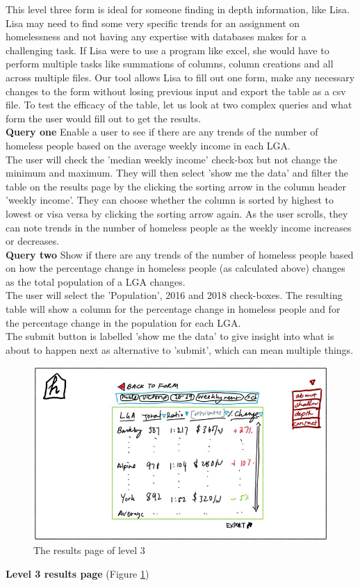 \documentclass[12pt, a4paper]{article}
\begin{document}
This level three form is ideal for someone finding in depth information, like Lisa. Lisa may need to find some very specific trends for an assignment on homelessness and not having any expertise with databases makes for a challenging task. If Lisa were to use a program like excel, she would have to perform multiple tasks like summations of columns, column creations and all across multiple files. Our tool allows Lisa to fill out one form, make any necessary changes to the form without losing previous input and export the table as a csv file.
To test the efficacy of the table, let us look at two complex queries and what form the user would fill out to get the results. \\
\textbf{Query one} Enable a user to see if there are any trends of the number of homeless people based on the average weekly income in each LGA. \\
The user will check the 'median weekly income' check-box but not change the minimum and maximum. They will then select 'show me the data' and filter the table on the results page by the clicking the sorting arrow in the column header 'weekly income'. They can choose whether the column is sorted by highest to lowest or visa versa by clicking the sorting arrow again. As the user scrolls, they can note trends in the number of homeless people as the weekly income increases or decreases. \\
\textbf{Query two} Show if there are any trends of the number of homeless people based on how the percentage change in homeless people (as calculated above) changes as the total population of a LGA changes. \\
The user will select the 'Population', 2016 and 2018 check-boxes. The resulting table will show a column for the percentage change in homeless people and for the percentage change in the population for each LGA.\\
The submit button is labelled 'show me the data' to give insight into what is about to happen next as alternative to 'submit', which can mean multiple things. 
\begin{figure}[h]
\centering
\includegraphics[scale=1]{level3results.jpg} 
\caption{The results page of level 3}
\label{fig:3results}
\end{figure}
\textbf{Level 3 results page} (Figure \ref{fig:3results}) 
\end{document}
